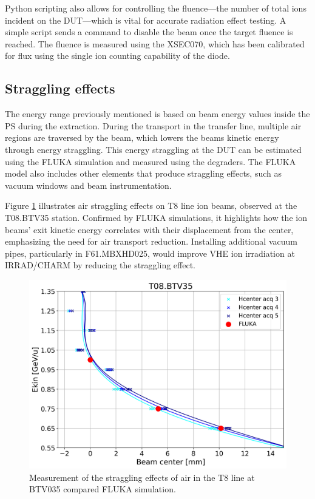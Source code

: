 \documentclass[a4paper,
               biblatex,     %
               ]{jacow}
\begin{document}
Python scripting also allows for controlling the fluence—the number of total ions incident on the DUT—which is vital for accurate radiation effect testing. A simple script sends a command to disable the beam once the target fluence is reached. The fluence is measured using the XSEC070, which has been calibrated for flux using the single ion counting capability of the diode.

\subsection{Straggling effects}
The energy range previously mentioned is based on beam energy values inside the PS during the extraction. During the transport in the transfer line, multiple air regions are traversed by the beam, which lowers the beams kinetic energy through energy straggling. This energy straggling at the DUT can be estimated using the FLUKA \cite{battistoni_overview_2015} simulation and measured using the degraders. The FLUKA model also includes other elements that produce straggling effects, such as vacuum windows and beam instrumentation. 

Figure \ref{fig:straggling_effects} illustrates air straggling effects on T8 line ion beams, observed at the T08.BTV35 station. Confirmed by FLUKA simulations, it highlights how the ion beams' exit kinetic energy correlates with their displacement from the center, emphasizing the need for air transport reduction. Installing additional vacuum pipes, particularly in F61.MBXHD025, would improve VHE ion irradiation at IRRAD/CHARM by reducing the straggling effect.
\begin{figure}[!htb]
   \centering
   \includegraphics*[width=1.0\columnwidth]{straggling_effects.png}
   \caption{Measurement of the straggling effects of air in the T8 line at BTV035 compared FLUKA simulation.}
   \label{fig:straggling_effects}
\end{figure}
\end{document}

